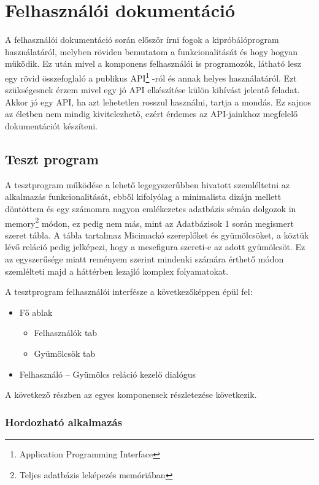 \chapter {Felhasználói dokumentáció}
\label{ch:user}

A felhasználói dokumentáció során először írni fogok a kipróbálóprogram használatáról, melyben röviden bemutatom a funkcionalitását és hogy hogyan működik. Ez után mivel a komponens felhasználói is programozók, látható lesz egy rövid összefoglaló a publikus API\footnote{Application Programming Interface} -ról és annak helyes használatáról. Ezt szükségesnek érzem mivel egy jó API elkészítése külön kihívást jelentő feladat. Akkor jó egy API, ha azt lehetetlen rosszul használni, tartja a mondás. Ez sajnos az életben nem mindig kivitelezhető, ezért érdemes az API-jainkhoz megfelelő dokumentációt készíteni.

\section{Teszt program}

A tesztprogram működése a lehető legegyszerűbben hivatott szemléltetni az alkalmazás funkcionalitását, ebből kifolyólag a minimalista dizájn mellett döntöttem és egy számomra nagyon emlékezetes adatbázis sémán dolgozok in memory\footnote{Teljes adatbázis leképezés memóriában} módon, ez pedig nem más, mint az Adatbázisok 1 során megismert szeret tábla. A tábla tartalmaz Micimackó szereplőket és gyümölcsöket, a köztük lévő reláció pedig jelképezi, hogy a mesefigura szereti-e az adott gyümölcsöt. Ez az egyszerűsége miatt reményem szerint mindenki számára érthető módon szemlélteti majd a háttérben lezajló komplex folyamatokat.

A tesztprogram felhasználói interfésze a következőképpen épül fel:
\begin{itemize}
	\item Fő ablak
    \begin{itemize}
    	\item Felhasználók tab
    	\item Gyümölcsök tab
    \end{itemize}
	\item Felhasználó – Gyümölcs reláció kezelő dialógus
\end{itemize}

A következő részben az egyes komponensek részletezése következik.

\subsection{Hordozható alkalmazás}

